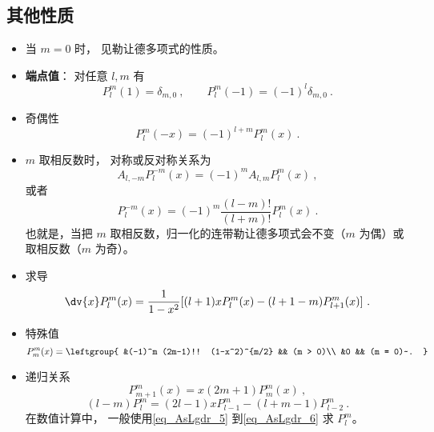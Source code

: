 \subsection{其他性质}
\begin{itemize}
\item 当 $m = 0$ 时， 见勒让德多项式的性质。

\item \textbf{端点值}： 对任意 $l, m$ 有
\begin{equation}\label{eq_AsLgdr_2}
P_l^m(1) = \delta_{m, 0}~,
\qquad
P_l^m(-1) = (-1)^l \delta_{m, 0}~.
\end{equation}
\item 奇偶性
\begin{equation}
P_l^m(-x) = (-1)^{l+m}P_l^m(x)~.
\end{equation}
\item $m$ 取相反数时， 对称或反对称关系为
\begin{equation}
A_{l,-m} P_l^{-m}(x) = (-1)^m A_{l,m} P_l^m(x)~,
\end{equation}
或者
\begin{equation}
P_l^{-m}(x) = (-1)^m \frac{(l-m)!}{(l+m)!} P_l^m(x)~.
\end{equation}
也就是，当把 $m$ 取相反数，归一化的连带勒让德多项式会不变（$m$ 为偶）或取相反数（$m$ 为奇）。
\item 求导
\begin{equation}
\dv{x} P_l^m(x) = \frac{1}{1-x^2} [(l+1)xP_l^m(x) - (l+1-m)P_{l+1}^m(x)]~.
\end{equation}
\item 特殊值
\begin{equation}\label{eq_AsLgdr_5} %
P_m^m(x) = \leftgroup{
&(-1)^m (2m-1)!! (1-x^2)^{m/2} && (m > 0)\\
&0 && (m = 0)~.
}\end{equation}
\item 递归关系
\begin{equation} %
P_{m+1}^m(x) = x (2m + 1) P_m^m(x)~,
\end{equation}
\begin{equation}\label{eq_AsLgdr_6} %
(l-m) P_l^m = (2l-1) x P_{l-1}^m - (l+m-1) P_{l-2}^m~.
\end{equation}
在数值计算中， 一般使用\autoref{eq_AsLgdr_5} 到\autoref{eq_AsLgdr_6} 求 $P_l^m$。
\end{itemize}
